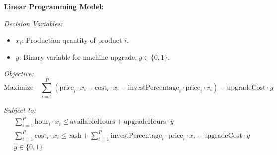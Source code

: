 \documentclass{article}
\begin{document}
\textbf{Linear Programming Model:}

\textit{Decision Variables:}
\begin{itemize}
    \item \( x_i \): Production quantity of product \( i \).
    \item \( y \): Binary variable for machine upgrade, \( y \in \{0, 1\} \).
\end{itemize}

\textit{Objective:} 
\[
\text{Maximize} \quad \sum_{i=1}^{P} \left( \text{price}_i \cdot x_i - \text{cost}_i \cdot x_i - \text{investPercentage}_i \cdot \text{price}_i \cdot x_i \right) - \text{upgradeCost} \cdot y
\]

\textit{Subject to:}
\begin{align*}
    & \sum_{i=1}^{P} \text{hour}_i \cdot x_i \leq \text{availableHours} + \text{upgradeHours} \cdot y \\
    & \sum_{i=1}^{P} \text{cost}_i \cdot x_i \leq \text{cash} + \sum_{i=1}^{P} \text{investPercentage}_i \cdot \text{price}_i \cdot x_i - \text{upgradeCost} \cdot y \\
    & y \in \{0, 1\}
\end{align*}
\end{document}
